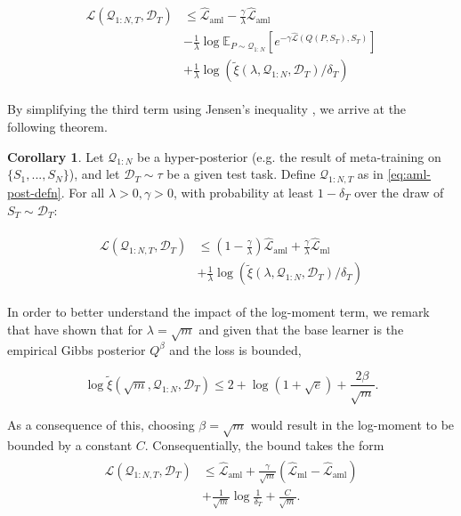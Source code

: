 \documentclass[letterpaper]{article} %
\theoremstyle{definition}
\newtheorem{corollary}[theorem]{Corollary}
\begin{document}
\begin{align*} 
\begin{split}
\mathcal{L}(\mathcal{Q}_{1:N,T}, \mathcal{D}_T) &\leq \hat{\mathcal{L}}_{\mathrm{aml}} -\frac{\gamma}{\lambda}\hat{\mathcal{L}}_{\mathrm{aml}} \\
&- \frac{1}{\lambda}\log \mathbb{E}_{P\sim \mathcal{Q}_{1:N}}\left [e^{-\gamma\hat{\mathcal{L}}(Q(P,S_T),S_T)}\right ]\\
&+\frac{1}{\lambda}\log\left (\tilde{\xi}(\lambda,\mathcal{Q}_{1:N},\mathcal{D}_T)/\delta_T\right )
\end{split}
\end{align*}

By simplifying the third term using Jensen's inequality , we arrive at the following theorem.

\begin{corollary} \label{thm:main-result-gibbs}
	Let $\mathcal{Q}_{1:N}$ be a hyper-posterior (e.g. the result of meta-training on $\{S_1,...,S_N\}$), and let $\mathcal{D}_T\sim \tau$ be a given test task. Define  $\mathcal{Q}_{1:N,T}$ as in \eqref{eq:aml-post-defn}. 
	For all $\lambda>0, \gamma>0$, 
	with probability at least $1-\delta_T$ over the draw of $S_T\sim \mathcal{D}_T$:
	
	\begin{align} \label{eq:pb-adapt-multi}
	\begin{split}
	\mathcal{L}(\mathcal{Q}_{1:N,T}, \mathcal{D}_T) &\leq 
	(1-\frac{\gamma}{\lambda})\hat{\mathcal{L}}_{\mathrm{aml}} + \frac{\gamma}{\lambda}\hat{\mathcal{L}}_{\mathrm{ml}} \\
	&+\frac{1}{\lambda}\log\left (\tilde{\xi}(\lambda,\mathcal{Q}_{1:N},\mathcal{D}_T)/\delta_T\right )
	\end{split}
	\end{align}
\end{corollary}

In order to better understand the impact of the log-moment term, we remark that \citet{Rivasplata2020} have shown that for $\lambda=\sqrt{m}$ and given that the base learner is the empirical Gibbs posterior $Q^\beta$ and the loss is bounded,

$$\log\tilde{\xi}(\sqrt{m},\mathcal{Q}_{1:N},\mathcal{D}_T) \leq 2+\log(1+\sqrt{e})+\frac{2\beta}{\sqrt{m}} .$$

As a consequence of this, choosing $\beta=\sqrt{m}$ would result 
in the log-moment to be bounded by a constant $C$. Consequentially, the bound takes the form
    \begin{align*}
    \begin{split}
    \mathcal{L}(\mathcal{Q}_{1:N,T}, \mathcal{D}_T) &\leq \hat{\mathcal{L}}_{\mathrm{aml}} +
    \frac{\gamma}{\sqrt{m}}(\hat{\mathcal{L}}_{\mathrm{ml}}-\hat{\mathcal{L}}_{\mathrm{aml}}) \\
&+\frac{1}{\sqrt{m}}\log\frac{1}{\delta_T}+\frac{C}{\sqrt{m}} .
    \end{split}
    \end{align*}
\end{document}
